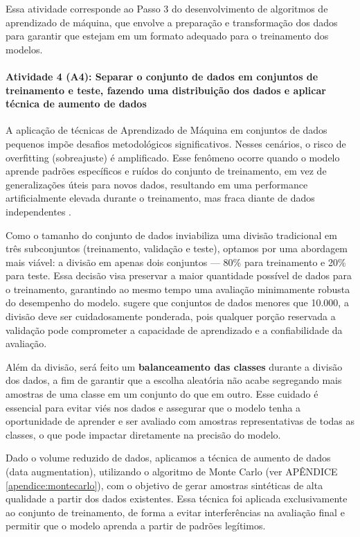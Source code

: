 Essa atividade corresponde ao Passo 3 do desenvolvimento de algoritmos de aprendizado de máquina, que envolve a preparação e transformação dos dados para garantir que estejam em um formato adequado para o treinamento dos modelos.

\paragraph{\textbf{Atividade 4 (A4):} Separar o conjunto de dados em conjuntos de treinamento e teste, fazendo uma distribuição dos dados e aplicar técnica de aumento de dados}

A aplicação de técnicas de Aprendizado de Máquina em conjuntos de dados pequenos impõe desafios metodológicos significativos. Nesses cenários, o risco de overfitting (sobreajuste) é amplificado. Esse fenômeno ocorre quando o modelo aprende padrões específicos e ruídos do conjunto de treinamento, em vez de generalizações úteis para novos dados, resultando em uma performance artificialmente elevada durante o treinamento, mas fraca diante de dados independentes \cite{bashir2020}.

Como o tamanho do conjunto de dados inviabiliza uma divisão tradicional em três subconjuntos (treinamento, validação e teste), optamos por uma abordagem mais viável: a divisão em apenas dois conjuntos — 80\% para treinamento e 20\% para teste. Essa decisão visa preservar a maior quantidade possível de dados para o treinamento, garantindo ao mesmo tempo uma avaliação minimamente robusta do desempenho do modelo.  sugere que conjuntos de dados menores que 10.000, a divisão deve ser cuidadosamente ponderada, pois qualquer porção reservada a validação pode comprometer a capacidade de aprendizado e a confiabilidade da avaliação.

Além da divisão, será feito um \textbf{balanceamento das classes} durante a divisão dos dados, a fim de garantir que a escolha aleatória não acabe segregando mais amostras de uma classe em um conjunto do que em outro. Esse cuidado é essencial para evitar viés nos dados e assegurar que o modelo tenha a oportunidade de aprender e ser avaliado com amostras representativas de todas as classes, o que pode impactar diretamente na precisão do modelo.

Dado o volume reduzido de dados, aplicamos a técnica de aumento de dados (data augmentation), utilizando o algoritmo de Monte Carlo (ver APÊNDICE \ref{apendice:montecarlo}), com o objetivo de gerar amostras sintéticas de alta qualidade a partir dos dados existentes. Essa técnica foi aplicada exclusivamente ao conjunto de treinamento, de forma a evitar interferências na avaliação final e permitir que o modelo aprenda a partir de padrões legítimos.  

